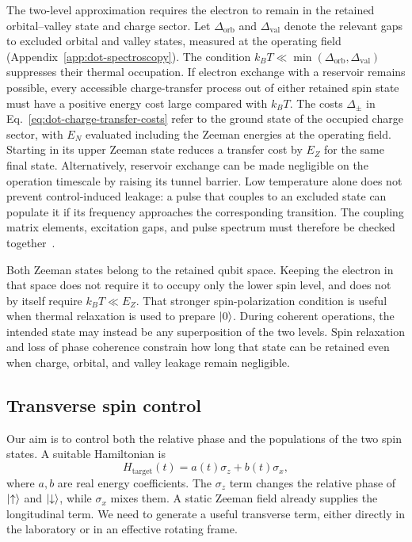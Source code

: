 The two-level approximation requires the electron to remain in the
retained orbital--valley state and charge sector. Let
$\Delta_{\mathrm{orb}}$ and $\Delta_{\mathrm{val}}$ denote the
relevant gaps to excluded orbital and valley states, measured at the
operating field (Appendix~\ref{app:dot-spectroscopy}). The condition
$k_BT\ll\min(\Delta_{\mathrm{orb}},\Delta_{\mathrm{val}})$
suppresses their thermal occupation. If electron exchange with a
reservoir remains possible, every accessible charge-transfer process
out of either retained spin state must have a positive energy cost
large compared with $k_BT$. The costs $\Delta_\pm$ in
Eq.~\eqref{eq:dot-charge-transfer-costs} refer to the ground state
of the occupied charge sector, with $E_N$ evaluated including the
Zeeman energies at the operating field. Starting in its upper Zeeman state
reduces a transfer cost by $E_Z$ for the same final state.
Alternatively, reservoir exchange can be made negligible on the
operation timescale by raising its tunnel barrier. Low temperature
alone does not prevent
control-induced leakage: a pulse that couples to an excluded state
can populate it if its frequency approaches the corresponding
transition. The coupling matrix elements, excitation gaps, and
pulse spectrum must therefore be checked together~\cite{Burkard2023}.

Both Zeeman states belong to the retained qubit space. Keeping the
electron in that space does not require it to occupy only the
lower spin level, and does not by itself require $k_BT\ll E_Z$.
That stronger spin-polarization condition is useful when thermal
relaxation is used to prepare $\lvert 0\rangle$. During coherent operations,
the intended state may instead be any superposition of the two
levels. Spin relaxation and loss of phase coherence constrain how
long that state can be retained even when charge, orbital, and
valley leakage remain negligible.

\subsection{Transverse spin control}
\label{sec:transverse-spin-control}

Our aim is to control both the relative phase and the populations
of the two spin states. A suitable Hamiltonian is
\begin{equation}
  H_{\mathrm{target}}(t)=a(t)\sigma_z+b(t)\sigma_x,
  \label{eq:single-spin-control-target}
\end{equation}
where $a,b$ are real energy coefficients.
The $\sigma_z$ term changes the relative phase of $\lvert \uparrow\rangle$
and $\lvert \downarrow\rangle$, while $\sigma_x$ mixes them.
A static Zeeman field already supplies the longitudinal term.
We need to generate a useful transverse term, either directly in
the laboratory or in an effective rotating frame.

